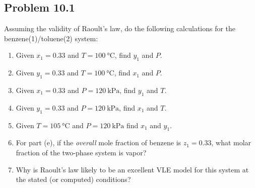 \documentclass[../main.tex]{subfiles}
\begin{document}
%
\subsection*{Problem 10.1}
%
Assuming the validity of Raoult's law, do the following calculations
for the benzene(1)/toluene(2) system:
%
\begin{enumerate}[label=(\alph*)]
  \item Given $x_{1} = 0.33$ and $T=100~\unit{\degreeCelsius}$, find
    $y_{1}$ and $P$.
  \item Given $y_{1} = 0.33$ and $T=100~\unit{\degreeCelsius}$, find
    $x_{1}$ and $P$.
  \item Given $x_{1} = 0.33$ and $P=120~\unit{\kilo\pascal}$, find
    $y_{1}$ and $T$.
  \item Given $y_{1} = 0.33$ and $P=120~\unit{\kilo\pascal}$, find
    $x_{1}$ and $T$.
  \item Given $T=105~\unit{\degreeCelsius}$ and
    $P=120~\unit{\kilo\pascal}$ find $x_{1}$ and $y_{1}$.
  \item For part (e), if the \textit{overall} mole fraction of
    benzene is $z_{1}=0.33$, what molar fraction of the two-phase
    system is vapor?
  \item Why is Raoult's law likely to be an excellent VLE model for
    this system at the stated (or computed) conditions?
\end{enumerate}
%
\end{document}
